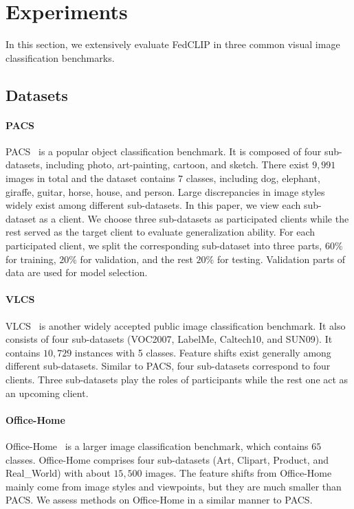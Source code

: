 \documentclass[11pt]{article}
\newcommand{\method}{FedCLIP\xspace}
\begin{document}
\section{Experiments}
\label{sec:exp}

In this section, we extensively evaluate \method in three common visual image classification benchmarks.

\subsection{Datasets}
\paragraph{PACS} PACS~\cite{Jindong-li2017deeper} is a popular object classification benchmark.
It is composed of four sub-datasets, including photo, art-painting, cartoon, and sketch.
There exist $9,991$ images in total and the dataset contains $7$ classes, including dog, elephant, giraffe, guitar, horse, house, and person.
Large discrepancies in image styles widely exist among different sub-datasets.
In this paper, we view each sub-dataset as a client.
We choose three sub-datasets as participated clients while the rest served as the target client to evaluate generalization ability.
For each participated client, we split the corresponding sub-dataset into three parts, $60\%$ for training, $20\%$ for validation, and the rest $20\%$ for testing.
Validation parts of data are used for model selection.

\paragraph{VLCS} VLCS~\cite{Jindong-fang2013unbiased} is another widely accepted public image classification benchmark.
It also consists of four sub-datasets (VOC2007, LabelMe, Caltech10, and SUN09).
It contains $10,729$ instances with 5 classes.
Feature shifts exist generally among different sub-datasets.
Similar to PACS, four sub-datasets correspond to four clients.
Three sub-datasets play the roles of participants while the rest one act as an upcoming client.

\paragraph{Office-Home} Office-Home~\cite{Jindong-venkateswara2017deep} is a larger image classification benchmark, which contains $65$ classes.
Office-Home comprises four sub-datasets (Art, Clipart, Product, and Real\_World) with about $15,500$ images.
The feature shifts from Office-Home mainly come from image styles and viewpoints, but they are much smaller than PACS.
We assess methods on Office-Home in a similar manner to PACS.
\end{document}
